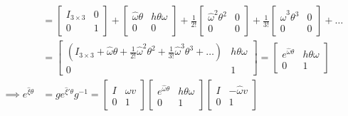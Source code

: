 \begin{align*}
      \\ & =
      \begin{bmatrix}
            I_{3\times 3} & 0 \\
            0             & 1
      \end{bmatrix}
      +
      \begin{bmatrix}
            \hat \omega \theta & h \theta \omega \\
            0                  & 0
      \end{bmatrix}
      +
      \frac{1}{2!}
      \begin{bmatrix}
            \hat \omega^2 \theta^2 & 0 \\
            0                      & 0
      \end{bmatrix}
      +
      \frac{1}{3!}
      \begin{bmatrix}
            \hat \omega^3 \theta^3 & 0 \\
            0                      & 0
      \end{bmatrix}
      + \ldots
      \\ & =
      \begin{bmatrix}
            \left( I_{3\times 3} + \hat \omega \theta + \frac{1}{2!} \hat \omega^2 \theta^2 + \frac{1}{3!} \hat \omega^3 \theta^3 + \ldots \right)
              &
            h \theta \omega
            \\
            0 & 1
      \end{bmatrix}
      =
      \begin{bmatrix}
            e^{\hat \omega \theta} & h \theta \omega \\
            0                      & 1
      \end{bmatrix}
      \\
      \implies
      e^{\hat{\xi} \theta}
       & =
      g e^{\hat{\xi}' \theta} g^{-1}
      =
      \begin{bmatrix}
            I & \hat \omega v \\
            0 & 1
      \end{bmatrix}
      \begin{bmatrix}
            e^{\hat \omega \theta} & h \theta \omega \\
            0                      & 1
      \end{bmatrix}
      \begin{bmatrix}
            I & - \hat \omega v \\
            0 & 1
      \end{bmatrix}

\end{align*}

